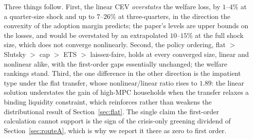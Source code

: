 

Three things follow. First, the linear CEV \emph{overstates} the welfare loss, by
$1$--$4\%$ at a quarter-size shock and up to $7$--$26\%$ at three-quarters, in the
direction the convexity of the adoption margin predicts; the paper's levels are
upper bounds on the losses, and would be overstated by an extrapolated
$10$--$15\%$ at the full shock size, which does not converge nonlinearly. Second,
the policy ordering, flat $>$ Slutsky $>$ cap $>$ ETS $>$ laissez-faire, holds
at every converged size, linear and nonlinear alike, with the first-order gaps
essentially unchanged; the welfare rankings stand. Third, the one difference in the
other direction is the impatient type under the flat transfer, whose
nonlinear/linear ratio rises to $1.89$: the linear solution understates the gain
of high-MPC households when the transfer relaxes a binding liquidity constraint,
which reinforces rather than weakens the distributional result of
Section~\ref{sec:flat}. The single claim the first-order calculation cannot
support is the sign of the crisis-only greening dividend of
Section~\ref{sec:routeA}, which is why we report it there as zero to first order.
